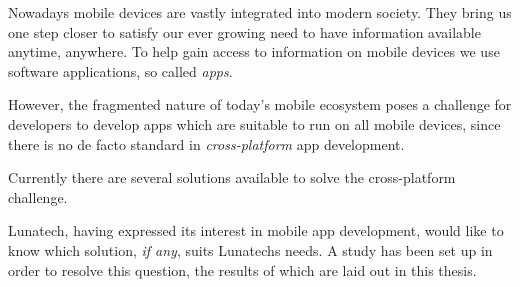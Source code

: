\newpage
\thispagestyle{empty}
\mbox{}

\samenvatting



Nowadays mobile devices are vastly integrated into modern society. They bring us one step closer to satisfy our ever growing need to have information available anytime, anywhere. To help gain access to information on mobile devices we use software applications, so called \emph{apps}. 

However, the fragmented nature of today's mobile ecosystem poses a challenge for developers to develop apps which are suitable to run on all mobile devices, since there is no de facto standard in \emph{cross-platform} app development.

Currently there are several solutions available to solve the cross-platform challenge.

Lunatech, having expressed its interest in mobile app development, would like to know which solution, \emph{if any}, suits Lunatechs needs. A study has been set up in order to resolve this question, the results of which are laid out in this thesis.


